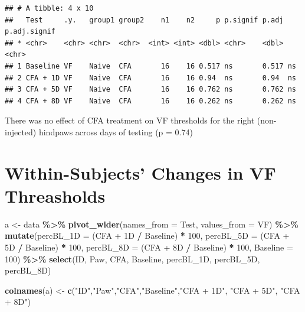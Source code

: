 \documentclass[
]{book}
\newenvironment{Shaded}{\begin{snugshade}}{\end{snugshade}}
\newcommand{\AttributeTok}[1]{\textcolor[rgb]{0.13,0.29,0.53}{#1}}
\newcommand{\DecValTok}[1]{\textcolor[rgb]{0.00,0.00,0.81}{#1}}
\newcommand{\FunctionTok}[1]{\textcolor[rgb]{0.13,0.29,0.53}{\textbf{#1}}}
\newcommand{\NormalTok}[1]{#1}
\newcommand{\OtherTok}[1]{\textcolor[rgb]{0.56,0.35,0.01}{#1}}
\newcommand{\SpecialCharTok}[1]{\textcolor[rgb]{0.81,0.36,0.00}{\textbf{#1}}}
\newcommand{\StringTok}[1]{\textcolor[rgb]{0.31,0.60,0.02}{#1}}
\begin{document}
\begin{verbatim}
## # A tibble: 4 x 10
##   Test     .y.   group1 group2    n1    n2     p p.signif p.adj p.adj.signif
## * <chr>    <chr> <chr>  <chr>  <int> <int> <dbl> <chr>    <dbl> <chr>       
## 1 Baseline VF    Naive  CFA       16    16 0.517 ns       0.517 ns          
## 2 CFA + 1D VF    Naive  CFA       16    16 0.94  ns       0.94  ns          
## 3 CFA + 5D VF    Naive  CFA       16    16 0.762 ns       0.762 ns          
## 4 CFA + 8D VF    Naive  CFA       16    16 0.262 ns       0.262 ns
\end{verbatim}

There was no effect of CFA treatment on VF thresholds for the right (non-injected) hindpaws across days of testing (p = 0.74)

\section*{Within-Subjects' Changes in VF Threasholds}\label{within-subjects-changes-in-vf-threasholds}

\begin{Shaded}
\begin{Highlighting}[]
\NormalTok{a }\OtherTok{\textless{}{-}}\NormalTok{ data }\SpecialCharTok{\%\textgreater{}\%}
  \FunctionTok{pivot\_wider}\NormalTok{(}\AttributeTok{names\_from =}\NormalTok{ Test, }\AttributeTok{values\_from =}\NormalTok{ VF) }\SpecialCharTok{\%\textgreater{}\%}
  \FunctionTok{mutate}\NormalTok{(}\AttributeTok{percBL\_1D =}\NormalTok{ (}\StringTok{\textasciigrave{}}\AttributeTok{CFA + 1D}\StringTok{\textasciigrave{}} \SpecialCharTok{/}\NormalTok{ Baseline) }\SpecialCharTok{*} \DecValTok{100}\NormalTok{,}
         \AttributeTok{percBL\_5D =}\NormalTok{ (}\StringTok{\textasciigrave{}}\AttributeTok{CFA + 5D}\StringTok{\textasciigrave{}} \SpecialCharTok{/}\NormalTok{ Baseline) }\SpecialCharTok{*} \DecValTok{100}\NormalTok{,}
         \AttributeTok{percBL\_8D =}\NormalTok{ (}\StringTok{\textasciigrave{}}\AttributeTok{CFA + 8D}\StringTok{\textasciigrave{}} \SpecialCharTok{/}\NormalTok{ Baseline) }\SpecialCharTok{*} \DecValTok{100}\NormalTok{,}
         \AttributeTok{Baseline =} \DecValTok{100}\NormalTok{) }\SpecialCharTok{\%\textgreater{}\%}
  \FunctionTok{select}\NormalTok{(ID, Paw, CFA, Baseline, percBL\_1D, percBL\_5D, percBL\_8D)}

\FunctionTok{colnames}\NormalTok{(a) }\OtherTok{\textless{}{-}} \FunctionTok{c}\NormalTok{(}\StringTok{"ID"}\NormalTok{,}\StringTok{"Paw"}\NormalTok{,}\StringTok{"CFA"}\NormalTok{,}\StringTok{"Baseline"}\NormalTok{,}\StringTok{"CFA + 1D"}\NormalTok{, }\StringTok{"CFA + 5D"}\NormalTok{, }\StringTok{"CFA + 8D"}\NormalTok{)}
\end{Highlighting}
\end{Shaded}
\end{document}
